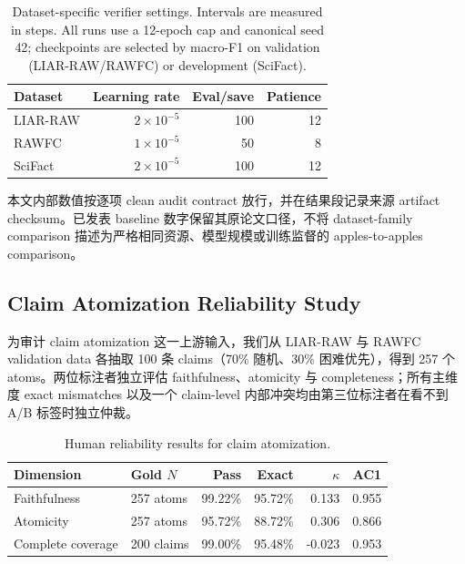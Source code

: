 \documentclass[letterpaper]{article}
\begin{document}
\begin{table}[t]
\centering
\scriptsize
\setlength{\tabcolsep}{2.5pt}
\renewcommand{\arraystretch}{1.08}
\caption{Dataset-specific verifier settings. Intervals are measured in steps. All runs use a 12-epoch cap and canonical seed 42; checkpoints are selected by macro-F1 on validation (LIAR-RAW/RAWFC) or development (SciFact).}
\label{tab:verifier-settings}
\begin{tabularx}{\columnwidth}{@{}Y r r r@{}}
\toprule
\textbf{Dataset} & \textbf{Learning rate} & \textbf{Eval/save} & \textbf{Patience} \\
\midrule
LIAR-RAW & $2\times10^{-5}$ & 100 & 12 \\
RAWFC & $1\times10^{-5}$ & 50 & 8 \\
SciFact & $2\times10^{-5}$ & 100 & 12 \\
\bottomrule
\end{tabularx}
\end{table}

本文内部数值按逐项 clean audit contract 放行，并在结果段记录来源 artifact checksum。已发表 baseline 数字保留其原论文口径，不将 dataset-family comparison 描述为严格相同资源、模型规模或训练监督的 apples-to-apples comparison。

\subsection{Claim Atomization Reliability Study}

为审计 claim atomization 这一上游输入，我们从 LIAR-RAW 与 RAWFC validation data 各抽取 100 条 claims（70\% 随机、30\% 困难优先），得到 257 个 atoms。两位标注者独立评估 faithfulness、atomicity 与 completeness；所有主维度 exact mismatches 以及一个 claim-level 内部冲突均由第三位标注者在看不到 A/B 标签时独立仲裁。

\begin{table}[t]
\centering
\scriptsize
\setlength{\tabcolsep}{1.5pt}
\renewcommand{\arraystretch}{1.08}
\caption{Human reliability results for claim atomization.}
\label{tab:atom-reliability}
\begin{tabularx}{\columnwidth}{@{}Y l r r r r@{}}
\toprule
\textbf{Dimension} & \textbf{Gold $N$} & \textbf{Pass} & \textbf{Exact} & \textbf{$\kappa$} & \textbf{AC1} \\
\midrule
Faithfulness & 257 atoms & 99.22\% & 95.72\% & 0.133 & 0.955 \\
Atomicity & 257 atoms & 95.72\% & 88.72\% & 0.306 & 0.866 \\
Complete coverage & 200 claims & 99.00\% & 95.48\% & -0.023 & 0.953 \\
\bottomrule
\end{tabularx}
\end{table}
\end{document}
